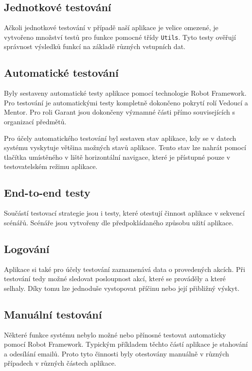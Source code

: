 \documentclass[czech,BP]{thesiskiv}
\begin{document}
	\subsection{Jednotkové testování}
	\par Ačkoli jednotkové testování v případě naší aplikace je velice omezené, je vytvořeno množství testů pro funkce pomocné třídy \texttt{Utils}. Tyto testy ověřují správnost výsledků funkcí na základě různých vstupních dat.
	\subsection{Automatické testování}
	\par Byly sestaveny automatické testy aplikace pomocí technologie Robot Framework. Pro testování je automatickými testy kompletně dokončeno pokrytí rolí Vedoucí a Mentor. Pro roli Garant jsou dokončeny významné části přímo souvisejících s organizací předmětů.
	\par Pro účely automatického testování byl sestaven stav aplikace, kdy se v datech systému vyskytuje většina možných stavů aplikace. Tento stav lze nahrát pomocí tlačítka  umístěného v liště horizontální navigace, které je přístupné pouze v testovatelském režimu aplikace.
	\subsection{End-to-end testy}
	\par Součástí testovací strategie jsou i testy, které otestují činnost aplikace v sekvencí scénářů. Scénáře jsou vytvořeny dle předpokládaného způsobu užití aplikace.
	\subsection{Logování}
	\par Aplikace si také pro účely testování zaznamenává data o provedených akcích. Při testování tedy možné sledovat posloupnost akcí, které se prováděly a které selhaly. Díky tomu lze jednoduše vystopovat příčinu nebo její přibližný výskyt.
	\subsection{Manuální testování}
	\par Některé funkce systému nebylo možné nebo přínosné testovat automaticky pomocí Robot Framework. Typickým příkladem těchto částí aplikace je stahování a odesílání emailů. Proto tyto činnosti byly otestovány manuálně v různých případech v různých částech aplikace.
\end{document}

